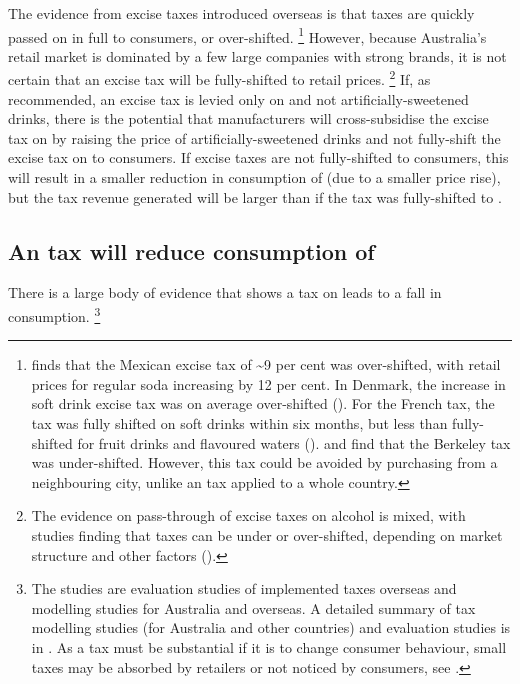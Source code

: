 \documentclass[embargoed]{grattan}
\begin{document}
The evidence from \SSB{} excise taxes introduced overseas is that taxes are quickly passed on in full to consumers, or over-shifted.%
\footnote{\textcite{Grogger2015Sodataxesprices} finds that the Mexican \SSB{} excise tax of \textasciitilde{}9 per cent was over-shifted, with retail prices for regular soda increasing by 12 per cent.
In Denmark, the increase in soft drink excise tax was on average over-shifted (\textcite{Bergman2010Areexcisetaxes}).
For the French \SSB{} tax, the tax was fully shifted on soft drinks within six months, but less than fully-shifted for fruit drinks and flavoured waters (\textcites{Berardi2016impactsodataxon}{Bonnet2013Taxincidencestrategic}). \textcite{Cawley2015IncidenceTaxesSugar} and \textcite{Falbe2015Higherretailprices} find that the Berkeley \SSB{} tax was under-shifted.
However, this tax could be avoided by purchasing from a neighbouring city, unlike an \SSB{} tax applied to a whole country.} However, because Australia's retail market is dominated by a few large companies with strong brands, it is not certain that an \SSB{} excise tax will be fully-shifted to retail prices.%
\footnote{The evidence on pass-through of excise taxes on alcohol is mixed, with studies finding that taxes can be under or over-shifted, depending on market structure and other factors (\textcites{Cawley2015economyscalesselective}{DeCicca2013Whopayscigarette}{Dube2004Multiplediscretenessproduct}).} If, as recommended, an excise tax is levied only on \SSBs{} and not artificially-sweetened drinks, there is the potential that manufacturers will cross-subsidise the excise tax on \SSBs{} by raising the price of artificially-sweetened drinks and not fully-shift the excise tax on \SSBs{} to consumers. If excise taxes are not fully-shifted to consumers, this will result in a smaller reduction in consumption of \SSBs{} (due to a smaller price rise), but the tax revenue generated will be larger than if the tax was fully-shifted to \SSBs{}.

\subsection{An \SSB{} tax will reduce consumption of \SSBs{}}\label{an-ssb-tax-will-reduce-consumption-of-ssbs}

There is a large body of evidence that shows a tax on \SSBs{} leads to a fall in consumption.%
\footnote{The studies are evaluation studies of implemented \SSB{} taxes overseas and modelling studies for Australia and overseas. A detailed summary of \SSB{} tax modelling studies (for Australia and other countries) and evaluation studies is in . As a tax must be substantial if it is to change consumer behaviour, small taxes may be absorbed by retailers or not noticed by consumers, see \textcites{Thow2014systematicrevieweffectiveness}{Powell2013Assessingpotentialeffectiveness}{Mytton2012Taxingunhealthyfood}{Team2016Sugarlevyworking}{LordanShouldweput}{Organization2016FiscalPoliciesDiet}.}
\end{document}
